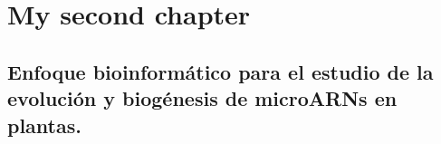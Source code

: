 
\chapter{My second chapter}

\graphicspath{{Chapter2/Figs/}}


\section[Short title]{Enfoque bioinformático para el estudio de la evolución y biogénesis de microARNs en plantas.}




